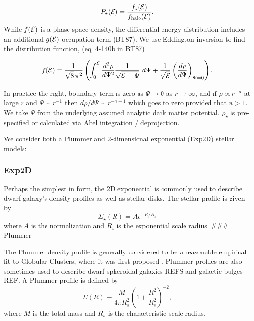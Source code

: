 \begin{equation}{
P_\star({\cal E}) = \frac{f_\star({\cal E})}{f_{\rm halo}({\cal E})}.
}\end{equation} While \(f({\cal E})\) is a phase-space density, the
differential energy distribution includes an additional \(g({\cal E})\)
occupation term (BT87). We use Eddington inversion to find the
distribution function, (eq. 4-140b in BT87)

\begin{equation}{
f({\cal E}) = \frac{1}{\sqrt{8}\, \pi^2}\left( \int_0^{\cal E} \frac{d^2\rho}{d\Psi^2} \frac{1}{\sqrt{{\cal E} - \Psi}}\ d\Psi + \frac{1}{\sqrt{\cal E}} \left(\frac{d\rho}{d\Psi}\right)_{\Psi=0} \right).
}\end{equation}

In practice the right, boundary term is zero as \(\Psi \to 0\) as
\(r\to\infty\), and if \(\rho \propto r^{-n}\) at large \(r\) and
\(\Psi \sim r^{-1}\) then \(d\rho / d\Psi \sim r^{-n+1}\) which goes to
zero provided that \(n > 1\). We take \(\Psi\) from the underlying
assumed analytic dark matter potential. \(\rho_\star\) is pre-specified
or calculated via Abel integration / deprojection.

We consider both a Plummer and 2-dimensional exponential (Exp2D) stellar
models:

\subsubsection{Exp2D}\label{exp2d}

Perhaps the simplest in form, the 2D exponential is commonly used to
describe dwarf galaxy's density profiles as well as stellar disks. The
stellar profile is given by \begin{equation}{
\Sigma_\star(R) = A e^{-R / R_s}
}\end{equation} where \(A\) is the normalization and \(R_s\) is the
exponential scale radius. \#\#\# Plummer

The Plummer density profile is generally considered to be a reasonable
empirical fit to Globular Clusters, where it was first proposed
\citep{sadfjk}. Plummer profiles are also sometimes used to describe
dwarf spheroidal galaxies REFS and galactic bulges REF. A Plummer
profile is defined by \begin{equation}{
\Sigma(R) = \frac{M}{4\pi R_s^2} \left(1 + \frac{R^2}{R_s^2}\right)^{-2} ,
}\end{equation} where \(M\) is the total mass and \(R_s\) is the
characteristic scale radius.

